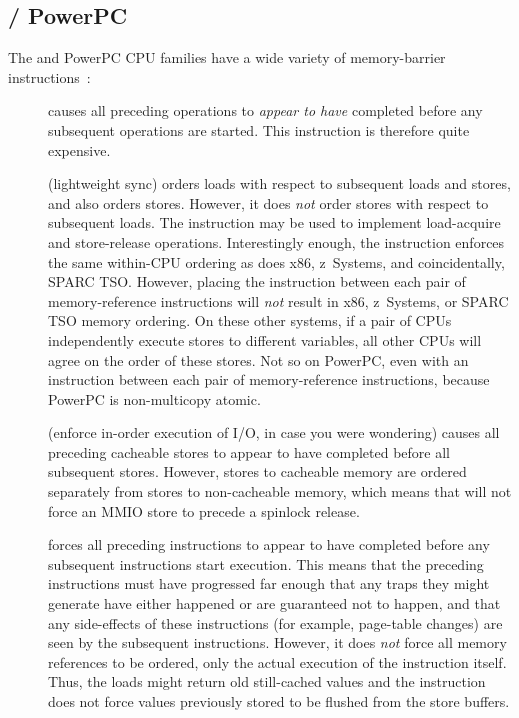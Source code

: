 \fi

\subsection{\Power{} / PowerPC}
\label{sec:memorder:POWER / PowerPC}

The \Power{} and PowerPC CPU families have a wide variety of memory-barrier
instructions~\cite{PowerPC94,MichaelLyons05a}:
\begin{description}
\item	[] causes all preceding operations to {\em appear to have}
	completed before any subsequent operations are started.
	This instruction is therefore quite expensive.
\item	[] (lightweight sync) orders loads with respect to
	subsequent loads and stores, and also orders stores.
	However, it does {\em not} order stores with respect to subsequent
	loads.
	The  instruction may be used to implement
	load-acquire and store-release operations.
	Interestingly enough, the  instruction enforces
	the same within-CPU ordering as does x86, z~Systems, and coincidentally,
	SPARC TSO\@.
	However, placing the  instruction between each
	pair of memory-reference instructions will \emph{not}
	result in x86, z~Systems, or SPARC TSO memory ordering.
	On these other systems, if a pair of CPUs independently execute
	stores to different variables, all other CPUs will agree on the
	order of these stores.
	Not so on PowerPC, even with an  instruction between each
	pair of memory-reference instructions, because PowerPC is
	non-multicopy atomic.
\item	[] (enforce in-order execution of I/O, in case you
	were wondering) causes all preceding cacheable stores to appear
	to have completed before all subsequent stores.
	However, stores to cacheable memory are ordered separately from
	stores to non-cacheable memory, which means that 
	will not force an MMIO store to precede a spinlock release.
\item	[] forces all preceding instructions to appear to have
	completed before any subsequent instructions start execution.
	This means that the preceding instructions must have progressed
	far enough that any traps they might generate have either happened
	or are guaranteed not to happen, and that any side-effects of
	these instructions (for example, page-table changes) are seen by the
	subsequent instructions.
	However, it does \emph{not} force all memory references to be
	ordered, only the actual execution of the instruction itself.
	Thus, the loads might return old still-cached values and the
	 instruction does not force values previously stored
	to be flushed from the store buffers.
\end{description}

